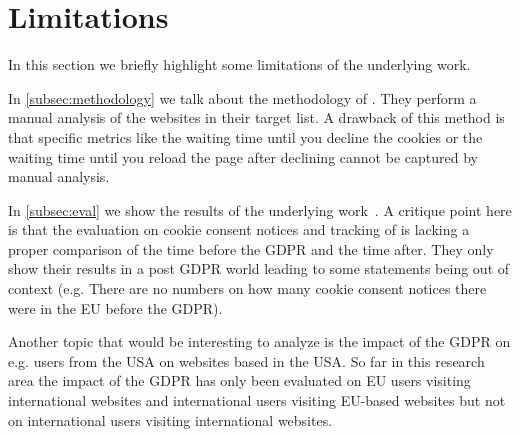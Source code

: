 \section{Limitations}
\label{sec:limitations}

In this section we briefly highlight some limitations of the underlying work.

In \autoref{subsec:methodology} we talk about the methodology of . They perform a manual analysis of
the websites in their target list. A drawback of this method is that specific metrics like the waiting time until you
decline the cookies or the waiting time until you reload the page after declining cannot be captured by manual analysis.

In \autoref{subsec:eval} we show the results of the underlying work~\cite{sanchez2019can}.
A critique point here is that the evaluation on cookie consent notices and tracking of \citeauthor{sanchez2019can}
is lacking a proper comparison of the time before
the GDPR and the time after. They only show their results in a post GDPR world leading to some statements being out of
context (e.g. There are no numbers on how many cookie consent notices there were in the EU before the GDPR).

Another topic that would be interesting to analyze is the impact of the GDPR on e.g. users from the USA on websites based in
the USA. So far in this research area the impact of the GDPR has only been evaluated on EU users visiting international websites and
international users visiting EU-based websites but not on international users visiting international websites.

